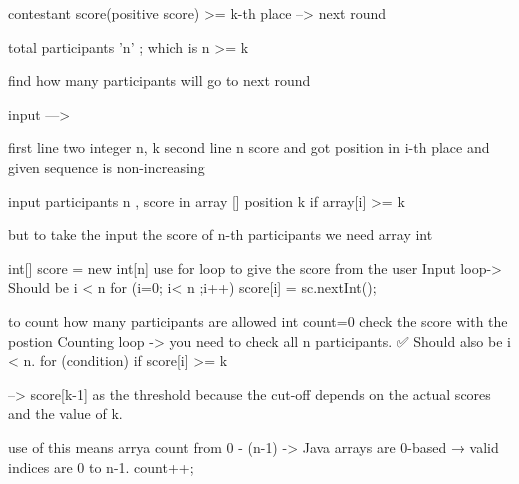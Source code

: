 contestant score(positive score) >= k-th place --> next round 

total participants 'n' ; which is n >= k

find how many participants will go to next round 

input ---> 

first line two integer n, k 
second line n score and got position in i-th place and given sequence is non-increasing

input participants n , 
score in array [] 
position k 
if array[i] >= k 
 
but to take the input the score of n-th participants 
we need array int 

int[] score = new int[n]
use for loop to give the score from the user 
Input loop-> Should be i < n
for (i=0; i< n ;i++){
    score[i] = sc.nextInt();
}

to count how many participants are allowed 
int count=0
check the score with the postion 
Counting loop -> you need to check all n participants.
✅ Should also be i < n.
for (condition)
if score[i] >= k 

--> score[k-1] as the threshold 
because the cut-off depends on the 
actual scores and the value of k.

use of this means arrya count from 0 - (n-1)
-> Java arrays are 0-based 
→ valid indices are 0 to n-1.
count++;
 